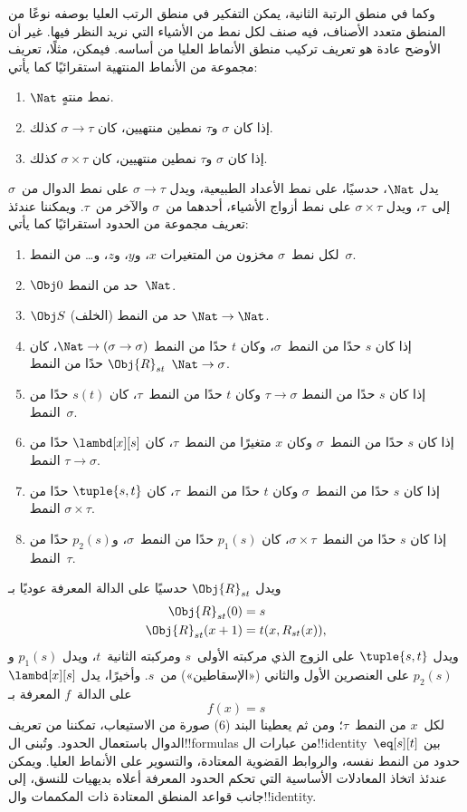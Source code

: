 \documentclass[../../../include/open-logic-section]{subfiles}
\begin{document}
وكما في منطق الرتبة الثانية، يمكن التفكير في منطق الرتب العليا بوصفه
نوعًا من المنطق متعدد الأصناف، فيه صنف لكل نمط من الأشياء التي نريد
النظر فيها. غير أن الأوضح عادة هو تعريف تركيب منطق الأنماط العليا من
أساسه. فيمكن، مثلًا، تعريف مجموعة من الأنماط المنتهية استقرائيًا كما
يأتي:
\begin{enumerate}
\item $\Nat$ نمط منتهٍ.
\item إذا كان $\sigma$ و$\tau$ نمطين منتهيين، كان $\sigma
  \to \tau$ كذلك.
\item إذا كان $\sigma$ و$\tau$ نمطين منتهيين، كان $\sigma \times
  \tau$ كذلك.
\end{enumerate}
يدل $\Nat$، حدسيًا، على نمط الأعداد الطبيعية، ويدل $\sigma \to
\tau$ على نمط الدوال من~$\sigma$ إلى~$\tau$، ويدل $\sigma \times
\tau$ على نمط أزواج الأشياء، أحدهما من~$\sigma$ والآخر من~$\tau$.
ويمكننا عندئذ تعريف مجموعة من الحدود استقرائيًا كما يأتي:
\begin{enumerate}
\item لكل نمط~$\sigma$ مخزون من المتغيرات $x$، و$y$، و$z$، و\dots
  من النمط~$\sigma$.
\item $\Obj 0$ حد من النمط~$\Nat$.
\item $\Obj S$ (الخلف) حد من النمط $\Nat \to \Nat$.
\item إذا كان $s$ حدًا من النمط~$\sigma$، وكان $t$ حدًا من النمط
  $\Nat \to (\sigma \to \sigma)$، كان $\Obj{R}_{st}$ حدًا من النمط
  $\Nat \to \sigma$.
\item إذا كان $s$ حدًا من النمط $\tau \to \sigma$ وكان $t$ حدًا من
  النمط~$\tau$، كان $s(t)$ حدًا من النمط~$\sigma$.
\item إذا كان $s$ حدًا من النمط~$\sigma$ وكان $x$ متغيرًا من
  النمط~$\tau$، كان $\lambd[x][s]$ حدًا من النمط $\tau \to \sigma$.
\item إذا كان $s$ حدًا من النمط~$\sigma$ وكان $t$ حدًا من
  النمط~$\tau$، كان $\tuple{s, t}$ حدًا من النمط $\sigma \times
  \tau$.
\item إذا كان $s$ حدًا من النمط~$\sigma \times \tau$، كان $p_1(s)$
  حدًا من النمط~$\sigma$، و$p_2(s)$ حدًا من النمط~$\tau$.
\end{enumerate}
ويدل $\Obj{R}_{st}$ حدسيًا على الدالة المعرفة عوديًا بـ
\begin{align*}
\Obj{R}_{st}(0) & = s \\
\Obj{R}_{st}(x+1) & = t(x, R_{st}(x)),
\end{align*}
ويدل $\tuple{s, t}$ على الزوج الذي مركبته الأولى~$s$ ومركبته
الثانية~$t$، ويدل $p_1(s)$ و$p_2(s)$ على العنصرين الأول والثاني
(«الإسقاطين») من~$s$. وأخيرًا، يدل $\lambd[x][s]$ على الدالة~$f$
المعرفة بـ
\[
f(x) = s
\]
لكل~$x$ من النمط~$\tau$؛ ومن ثم يعطينا البند (6) صورة من الاستيعاب،
تمكننا من تعريف الدوال باستعمال الحدود. وتُبنى ال!!{formula}s من
عبارات ال!!{identity}~$\eq[s][t]$ بين حدود من النمط نفسه، والروابط
القضوية المعتادة، والتسوير على الأنماط العليا. ويمكن عندئذ اتخاذ
المعادلات الأساسية التي تحكم الحدود المعرفة أعلاه بديهيات للنسق، إلى
جانب قواعد المنطق المعتادة ذات المكممات وال!!{identity}.
\end{document}
